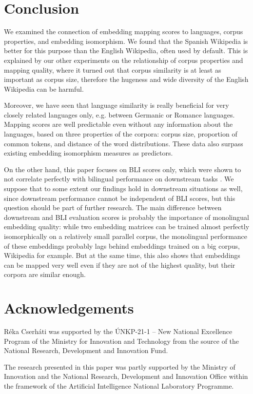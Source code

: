 \documentclass[11pt]{article}
\begin{document}
    
\section{Conclusion}
    We examined the connection of embedding mapping scores to languages, corpus properties, and embedding isomorphism. We found that the Spanish Wikipedia is better for this purpose than the English Wikipedia, often used by default. This is explained by our other experiments on the relationship of corpus properties and mapping quality, where it turned out that corpus similarity is at least as important as corpus size, therefore the hugeness and wide diversity of the English Wikipedia can be harmful. 
    
    Moreover, we have seen that language similarity is really beneficial for very closely related languages only, e.g. between Germanic or Romance languages. Mapping scores are well predictable even without any information about the languages, based on three properties of the corpora: corpus size, proportion of common tokens, and distance of the word distributions. These data also surpass existing embedding isomorphism measures as predictors.
    
    On the other hand, this paper focuses on BLI scores only, which were shown to not correlate perfectly with bilingual performance on downstream tasks \cite{glavas-etal-2019-properly}. We suppose that to some extent our findings hold in downstream situations as well, since downstream performance cannot be independent of BLI scores, but this question should be part of further research. The main difference between downstream and BLI evaluation scores is probably the importance of monolingual embedding quality: while two embedding matrices can be trained almost perfectly isomorphically on a relatively small parallel corpus, the monolingual performance of these embeddings probably lags behind embeddings trained on a big corpus, Wikipedia for example. But at the same time, this also shows that embeddings can be mapped very well even if they are not of the highest quality, but their corpora are similar enough. 
    
\section*{Acknowledgements}
Réka Cserháti was supported by the ÚNKP-21-1 -- New National Excellence Program of the Ministry for Innovation and Technology from the source of the National Research, Development and Innovation Fund.

The research presented in this paper was partly supported by the Ministry of Innovation and the National Research, Development and Innovation Office within the framework of the Artificial Intelligence National Laboratory Programme.

\nocite{lin-etal-2019-choosing} 
\nocite{patra-etal-2019-bilingual}
\nocite{ormazabal-etal-2019-analyzing}
\nocite{ruder2019survey}




\end{document}
